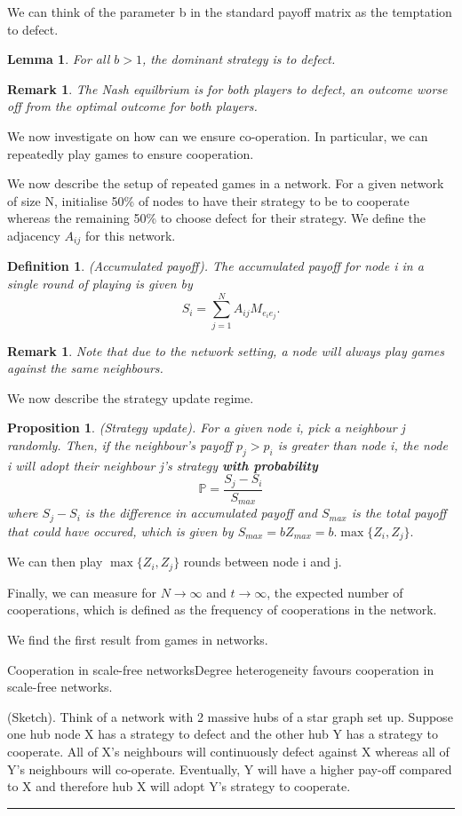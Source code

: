 \documentclass[twoside]{article}
\newtheorem{lemma}[theorem]{Lemma}
\newtheorem{proposition}[theorem]{Proposition}
\newtheorem{definition}[theorem]{Definition}
\newtheorem{remark}[theorem]{Remark}
\newenvironment{proof}{{\bf Proof:}}{\hfill\rule{2mm}{2mm}}
\begin{document}
We can think of the parameter b in the standard payoff matrix as the temptation to defect.

\begin{lemma}For all $b > 1$, the dominant strategy is to defect.
\end{lemma}

\begin{remark}The Nash equilbrium is for both players to defect, an outcome worse off from the optimal outcome for both players.
\end{remark}

We now investigate on how can we ensure co-operation. In particular, we can repeatedly play games to ensure cooperation.

We now describe the setup of repeated games in a network. For a given network of size N, initialise 50\% of nodes to have their strategy to be to cooperate whereas the remaining 50\% to choose defect for their strategy. We define the adjacency $A_{ij}$ for this network. 

\begin{definition}(Accumulated payoff). The accumulated payoff for node i in a single round of playing is given by 
$$
S_i = \sum_{j=1}^{N}A_{ij}M_{e_{i}e_{j}}.
$$
\end{definition}

\begin{remark}Note that due to the network setting, a node will always play games against the same neighbours.
\end{remark}
We now describe the strategy update regime. 

\begin{proposition}(Strategy update). For a given node i, pick a neighbour j randomly. Then, if the neighbour's payoff $p_j > p_i$ is greater than node i, the node i will adopt their neighbour j's strategy \textbf{with probability}
$$
\mathbb{P} = \frac{S_j - S_i}{S_{max}}
$$
where $S_j - S_i$ is the difference in accumulated payoff and $S_{max}$ is the total payoff that could have occured, which is given by $S_{max} = bZ_{max} = b.\max\{Z_i, Z_j\}.$
\end{proposition}

We can then play $\max\{Z_i, Z_j\}$ rounds between node i and j.

Finally, we can measure for $N \rightarrow \infty$ and $t \rightarrow \infty$, the expected number of cooperations, which is defined as the frequency of cooperations in the network.

We find the first result from games in networks.
\begin{proposition_exam}{Cooperation in scale-free networks}{}Degree heterogeneity favours cooperation in scale-free networks.
\end{proposition_exam}
\begin{proof}(Sketch). Think of a network with 2 massive hubs of a star graph set up. Suppose one hub node X has a strategy to defect and the other hub Y has a strategy to cooperate. All of X's neighbours will continuously defect against X whereas all of Y's neighbours will co-operate. Eventually, Y will have a higher pay-off compared to X and therefore hub X will adopt Y's strategy to cooperate.
\end{proof}
\end{document}
